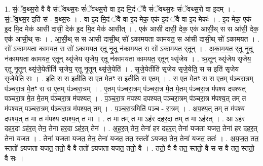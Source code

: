 \documentclass[17pt]{extarticle}
\begin{document}
1. सं॒ॅव॒थ्स॒रो वै वै सं॑ॅवथ्स॒रः सं॑ॅवथ्स॒रो वा इ॒द मि॒दं ॅवै सं॑ॅवथ्स॒रः सं॑ॅवथ्स॒रो वा इ॒दम् । . सं॒ॅव॒थ्स॒र इति॑ सं - व॒थ्स॒रः । . वा इ॒द मि॒दं ॅवै वा इ॒द मेक॒ एक॑ इ॒दं ॅवै वा इ॒द मेकः॑ । . इ॒द मेक॒ एक॑ इ॒द मि॒द मेक॑ आसी दासी॒ देक॑ इ॒द मि॒द मेक॑ आसीत् । . एक॑ आसी दासी॒ देक॒ एक॑ आसी॒थ् स स आ॑सी॒ देक॒ एक॑ आसी॒थ् सः । . आ॒सी॒थ् स स आ॑सी दासी॒थ् सो॑ ऽकामयता कामयत॒ स आ॑सी दासी॒थ् सो॑ ऽकामयत । . सो॑ ऽकामयता कामयत॒ स सो॑ ऽकामयत॒ र्‌तू नृ॒तू न॑कामयत॒ स सो॑ ऽकामयत॒ र्‌तून् । . अ॒का॒म॒य॒त॒ र्‌तू नृ॒तू न॑कामयता कामयत॒ र्‌तून् थ्सृ॑जेय सृजेय॒ र्‌तू न॑कामयता कामयत॒ र्‌तून् थ्सृ॑जेय । . ऋ॒तून् थ्सृ॑जेय सृजेय॒ र्‌तू नृ॒तून् थ्सृ॑जे॒येतीति॑ सृजेय॒ र्‌तू नृ॒तून् थ्सृ॑जे॒येति॑ । . सृ॒जे॒येतीति॑ सृजेय सृजे॒येति॒ स स इति॑ सृजेय सृजे॒येति॒ सः । . इति॒ स स इतीति॒ स ए॒त मे॒तꣳ स इतीति॒ स ए॒तम् । . स ए॒त मे॒तꣳ स स ए॒तम् प॑ञ्चरा॒त्रम् प॑ञ्चरा॒त्र मे॒तꣳ स स ए॒तम् प॑ञ्चरा॒त्रम् । . ए॒तम् प॑ञ्चरा॒त्रम् प॑ञ्चरा॒त्र मे॒त मे॒तम् प॑ञ्चरा॒त्र म॑पश्य दपश्यत् पञ्चरा॒त्र मे॒त मे॒तम् प॑ञ्चरा॒त्र म॑पश्यत् । . प॒ञ्च॒रा॒त्र म॑पश्य दपश्यत् पञ्चरा॒त्रम् प॑ञ्चरा॒त्र म॑पश्य॒त् तम् त म॑पश्यत् पञ्चरा॒त्रम् प॑ञ्चरा॒त्र म॑पश्य॒त् तम् । . प॒ञ्च॒रा॒त्रमिति॑ पञ्च - रा॒त्रम् । . अ॒प॒श्य॒त् तम् त म॑पश्य दपश्य॒त् त मा त म॑पश्य दपश्य॒त् त मा । . त मा तम् त मा ऽह॑र दहर॒दा तम् त मा ऽह॑रत् । . आ ऽह॑र दहर॒दा ऽह॑र॒त् तेन॒ तेना॑ हर॒दा ऽह॑र॒त् तेन॑ । . अ॒ह॒र॒त् तेन॒ तेना॑ हर दहर॒त् तेना॑ यजता यजत॒ तेना॑ हर दहर॒त् तेना॑ यजत । . तेना॑ यजता यजत॒ तेन॒ तेना॑ यजत॒ तत॒ स्ततो॑ ऽयजत॒ तेन॒ तेना॑ यजत॒ ततः॑ । . अ॒य॒ज॒त॒ तत॒ स्ततो॑ ऽयजता यजत॒ ततो॒ वै वै ततो॑ ऽयजता यजत॒ ततो॒ वै । . ततो॒ वै वै तत॒ स्ततो॒ वै स स वै तत॒ स्ततो॒ वै सः । \newline
\end{document}
